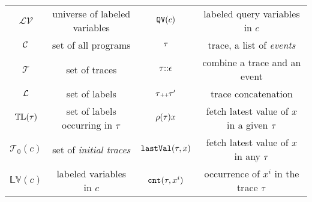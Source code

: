     \begin{table}
      \caption{}
      \label{tb:notation}
      \begin{center}
        \begin{tabular}{| c |c |c| c| }
          \hline 
          $\mathcal{LV}$   & universe of labeled variables  & $\mathtt{QV}(c)$ & labeled query variables in $c$\\ 
          $\mathcal{C}$  & set of all programs &  $\mathtt{\tau}$ &   trace, a list of \emph{events}\\  
          $\mathcal{T}$  &  set of traces &  $\mathtt{\tau} {\small ::} \mathtt{\epsilon}$  & combine a trace and an event  \\
          $\mathcal{L}$ & set of labels  & $\mathtt{\tau} {\scriptscriptstyle ++} \mathtt{\tau}'$ &  trace concatenation \\
          $\mathbb{TL}(\mathtt{\tau}) $  &set of labels occurring in $\mathtt{\tau}$  &  $ \rho (\mathtt{\tau}) x$  & fetch latest value of  $x$ in a given $\mathtt{\tau}$ \\
          $\mathcal{T}_0(c) $ &  set of \emph{initial traces} & $\mathtt{lastVal} (\mathtt{\tau}, x)$  & fetch latest value of  $x$ in any $\mathtt{\tau}$\\
          $\mathbb{LV}(c)$  & labeled variables in $c$ & $\mathtt{cnt}(\mathtt{\tau}, x^i)$ & occurrence of $x^i$ in the trace $\mathtt{\tau}$\\
          \hline 
        \end{tabular}
        \end{center}
      \end{table}
